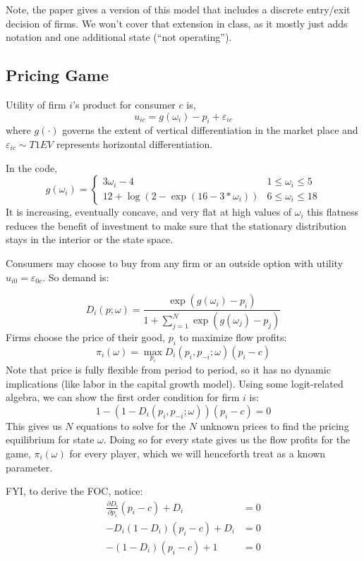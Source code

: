 \documentclass[twoside]{article}
\begin{document}
Note, the paper gives a version of this model that includes a discrete entry/exit decision of firms.  We won't cover that extension in class, as it mostly just adds notation and one additional state (``not operating'').

\subsection{Pricing Game}

Utility of firm $i$'s product for consumer $c$ is, 
$$u_{ic} = g(\omega_i) - p_i + \varepsilon_{ic}$$
where $g(\cdot)$ governs the extent of vertical differentiation in the market place and $\varepsilon_{ic} \sim T1EV$ represents horizontal differentiation. 

In the code, 
$$g(\omega_i) = 
\begin{cases} 3\omega_i -4 & 1 \leq \omega_i \leq 5 \\
12 + \log(2 - \exp(16 - 3*\omega_i)) & 6 \leq \omega_i \leq 18
\end{cases} $$
It is increasing, eventually concave, and very flat at high values of $\omega_i$ this flatness reduces the benefit of investment to make sure that the stationary distribution stays in the interior or the state space. 

Consumers may choose to buy from any firm or an outside option with utility $u_{i0} = \varepsilon_{0c}$. So demand is: 

$$D_i(p ; \omega) = \frac{ \exp( g(\omega_i) - p_i) }{ 1 + \sum_{j=1}^N  \exp( g(\omega_j) - p_j)} $$
Firms choose the price of their good, $p_i$ to maximize flow profits: 
$$\pi_i(\omega) = \max_{p_i} D_i(p_i, p_{-i}; \omega)(p_i - c) $$
Note that price is fully flexible from period to period, so it has no dynamic implications (like labor in the capital growth model). 
Using some logit-related algebra, we can show the first order condition for firm $i$ is: 
$$ 1 - (1-D_i(p_i, p_{-i}; \omega))(p_i - c) = 0 $$ 
This gives us $N$ equations to solve for the $N$ unknown prices to find the pricing equilibrium for state $\omega$. Doing so for every state gives us the
flow profits for the game, $\pi_i(\omega)$ for every player, which we will henceforth treat as a known parameter.

FYI, to derive the FOC, notice: 
\begin{align*} 
\frac{\partial{D_i}}{\partial p_i} (p_i - c) + D_i &= 0 \\
-D_i (1 - D_i)(p_i - c) + D_i & = 0 \\
-(1 - D_i)(p_i - c) + 1 & = 0 \\
\end{align*}
\end{document}

